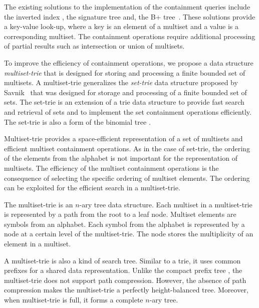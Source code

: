 The existing solutions to the implementation of the containment queries include the inverted index \cite{zobel1992efficient,zobel1998inverted,broder2006indexing}, the signature tree \cite{tousidou2002sigstruc,yangjun2005stree,zobel1998inverted} and, the B+ tree~\cite{Helmer2003}. These solutions provide a key-value look-up, where a key is an element of a multiset and a value is a corresponding multiset. The containment operations require additional processing of partial results such as intersection or union of multisets.

To improve the efficiency of containment operations, we propose a data structure \emph{multiset-trie} that is designed for storing and processing a finite bounded set of multisets. A multiset-trie generalizes the \emph{set-trie} data structure proposed by Savnik~\cite{savnik2013index,savnik2021plos} that was designed for storage and processing of a finite bounded set of sets. 
The set-trie is an extension of a trie data structure to provide fast search and retrieval of sets and to implement the set containment operations efficiently. The set-trie is also a form of the binomial tree \cite{corman2001}.

Multiset-trie provides a space-efficient representation of a set of multisets and efficient multiset containment operations. As in the case of set-trie, the ordering of the elements from the alphabet is not important for the representation of multisets. The efficiency of the multiset containment operations is the consequence of selecting the specific ordering of multiset elements. The ordering can be exploited for the efficient search in a multiset-trie.  

The multiset-trie is an $n$-ary tree data structure. Each multiset in a multiset-trie is represented by a path from the root to a leaf node. Multiset elements are symbols from an alphabet. Each symbol from the alphabet is represented by a node at a certain level of the multiset-trie. The node stores the multiplicity of an element in a multiset.

A multiset-trie is also a kind of search tree. Similar to a trie, it uses common prefixes for a shared data representation. Unlike the compact prefix tree \cite{Sedgewick:2011:ALG:2011916}, the multiset-trie does not support path compression. However, the absence of path compression makes the multiset-trie a perfectly height-balanced tree. Moreover, when multiset-trie is full, it forms a complete $n$-ary tree.

